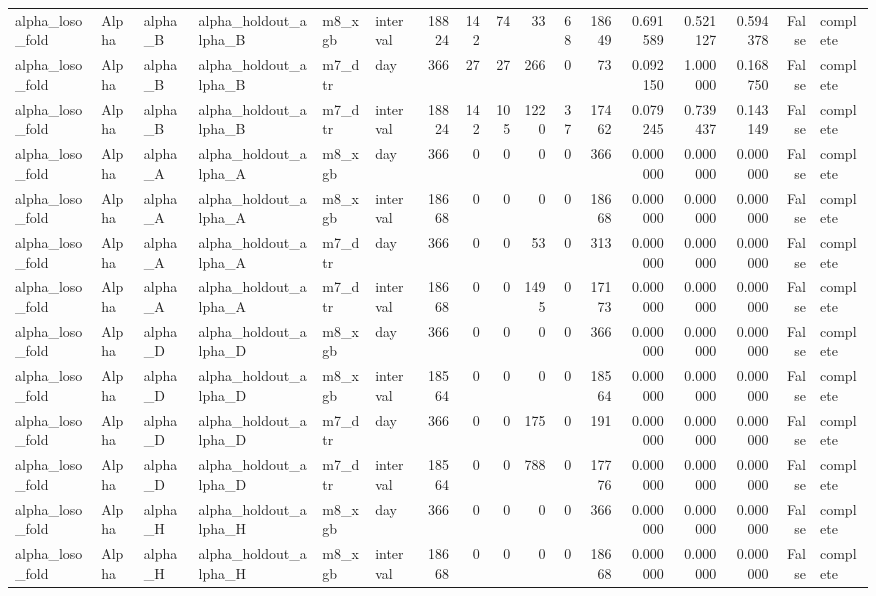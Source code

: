 \begin{tabular}{llllllrrrrrrrrrrl}
alpha_loso_fold & Alpha & alpha_B & alpha_holdout_alpha_B & m8_xgb & interval & 18824 & 142 & 74 & 33 & 68 & 18649 & 0.691589 & 0.521127 & 0.594378 & False & complete \\
alpha_loso_fold & Alpha & alpha_B & alpha_holdout_alpha_B & m7_dtr & day & 366 & 27 & 27 & 266 & 0 & 73 & 0.092150 & 1.000000 & 0.168750 & False & complete \\
alpha_loso_fold & Alpha & alpha_B & alpha_holdout_alpha_B & m7_dtr & interval & 18824 & 142 & 105 & 1220 & 37 & 17462 & 0.079245 & 0.739437 & 0.143149 & False & complete \\
alpha_loso_fold & Alpha & alpha_A & alpha_holdout_alpha_A & m8_xgb & day & 366 & 0 & 0 & 0 & 0 & 366 & 0.000000 & 0.000000 & 0.000000 & False & complete \\
alpha_loso_fold & Alpha & alpha_A & alpha_holdout_alpha_A & m8_xgb & interval & 18668 & 0 & 0 & 0 & 0 & 18668 & 0.000000 & 0.000000 & 0.000000 & False & complete \\
alpha_loso_fold & Alpha & alpha_A & alpha_holdout_alpha_A & m7_dtr & day & 366 & 0 & 0 & 53 & 0 & 313 & 0.000000 & 0.000000 & 0.000000 & False & complete \\
alpha_loso_fold & Alpha & alpha_A & alpha_holdout_alpha_A & m7_dtr & interval & 18668 & 0 & 0 & 1495 & 0 & 17173 & 0.000000 & 0.000000 & 0.000000 & False & complete \\
alpha_loso_fold & Alpha & alpha_D & alpha_holdout_alpha_D & m8_xgb & day & 366 & 0 & 0 & 0 & 0 & 366 & 0.000000 & 0.000000 & 0.000000 & False & complete \\
alpha_loso_fold & Alpha & alpha_D & alpha_holdout_alpha_D & m8_xgb & interval & 18564 & 0 & 0 & 0 & 0 & 18564 & 0.000000 & 0.000000 & 0.000000 & False & complete \\
alpha_loso_fold & Alpha & alpha_D & alpha_holdout_alpha_D & m7_dtr & day & 366 & 0 & 0 & 175 & 0 & 191 & 0.000000 & 0.000000 & 0.000000 & False & complete \\
alpha_loso_fold & Alpha & alpha_D & alpha_holdout_alpha_D & m7_dtr & interval & 18564 & 0 & 0 & 788 & 0 & 17776 & 0.000000 & 0.000000 & 0.000000 & False & complete \\
alpha_loso_fold & Alpha & alpha_H & alpha_holdout_alpha_H & m8_xgb & day & 366 & 0 & 0 & 0 & 0 & 366 & 0.000000 & 0.000000 & 0.000000 & False & complete \\
alpha_loso_fold & Alpha & alpha_H & alpha_holdout_alpha_H & m8_xgb & interval & 18668 & 0 & 0 & 0 & 0 & 18668 & 0.000000 & 0.000000 & 0.000000 & False & complete \\

\end{tabular}
